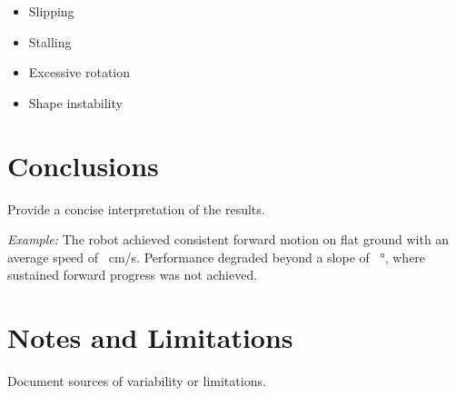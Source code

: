 \documentclass[11pt]{article}
\begin{document}
\begin{itemize}[noitemsep]
    \item Slipping
    \item Stalling
    \item Excessive rotation
    \item Shape instability
\end{itemize}

\section*{Conclusions}
Provide a concise interpretation of the results.

\textit{Example:} The robot achieved consistent forward motion on flat ground with an average speed of \underline{\hspace{1cm}}~cm/s. Performance degraded beyond a slope of \underline{\hspace{1cm}}~\si{\degree}, where sustained forward progress was not achieved.

\section*{Notes and Limitations}
Document sources of variability or limitations.
\end{document}
